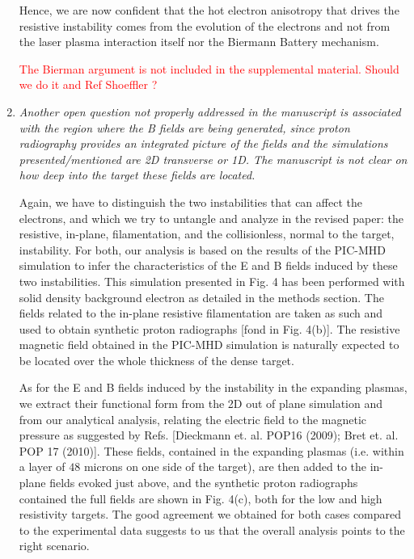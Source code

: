 \documentclass{article}
\begin{document}
\begin{enumerate}
Hence, we are now confident that the hot electron anisotropy that drives the resistive instability  comes from the evolution of the electrons and not from the laser plasma interaction itself nor the Biermann Battery mechanism. 

\textcolor{red}{ The Bierman argument is not included in the supplemental material.  Should we do it and  Ref Shoeffler ?  }

\item \textit{ Another open question not properly addressed in the manuscript is associated with the region where the B fields are being generated, since proton radiography provides an integrated picture of the fields and the simulations presented/mentioned are 2D transverse or 1D. The manuscript is not clear on how deep into the target these fields are located. }

Again, we have to distinguish the two instabilities that can affect the electrons, and which we try to untangle and analyze in the revised paper: the resistive, in-plane, filamentation, and the collisionless, normal to the target, instability. 
For both,  our analysis is based on the results of the PIC-MHD simulation to infer the characteristics of the E and B fields induced by these two instabilities. This simulation presented in Fig. 4 has been performed with solid density background   electron as detailed in the methods section. The fields related to the in-plane resistive filamentation are taken as such and used to obtain synthetic proton radiographs [fond in Fig. 4(b)]. The resistive magnetic field   obtained in the PIC-MHD simulation is naturally expected to be located over the whole thickness of the dense target.  

As for the E and  B fields induced by the instability in the expanding plasmas, we extract their functional form from the 2D out of plane simulation and from our analytical analysis, relating the electric field to the magnetic pressure as suggested by Refs. [Dieckmann et. al. POP16 (2009); Bret et. al. POP 17 (2010)]. These fields, contained in the expanding plasmas (i.e. within a layer of $48$ microns on one side of the target), are then added to the in-plane fields evoked just above, and the synthetic proton radiographs contained the full fields are shown in Fig. 4(c), both for the low and high resistivity targets. The good agreement we obtained for both cases compared to the experimental data suggests to us that the overall analysis points to the right scenario.


\end{enumerate}
\end{document}
